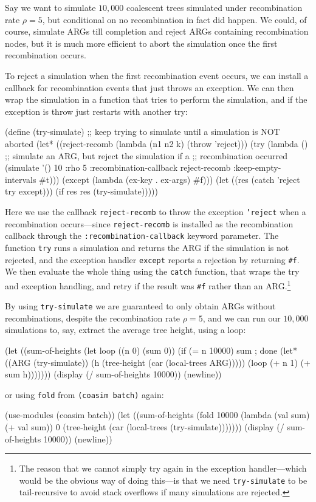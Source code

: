 \documentclass{manual}
\begin{document}
Say we want to simulate $10,000$ coalescent trees simulated under
recombination rate $\rho=5$, but conditional on no recombination in
fact did happen.  We could, of course, simulate ARGs till completion
and reject ARGs containing recombination nodes, but it is much more
efficient to abort the simulation once the first recombination occurs.

To reject a simulation when the first recombination event occurs, we
can install a callback for recombination events that just throws an
exception.  We can then wrap the simulation in a function that tries
to perform the simulation, and if the exception is throw just restarts
with another try:
\begin{code}
(define (try-simulate)
  ;; keep trying to simulate until a simulation is NOT aborted
  (let* ((reject-recomb (lambda (n1 n2 k) (throw 'reject)))
         (try (lambda ()
                ;; simulate an ARG, but reject the simulation if a
                ;; recombination occurred
                (simulate '() 10 :rho 5
                          :recombination-callback reject-recomb
                          :keep-empty-intervals   #t)))
         (except (lambda (ex-key . ex-args) #f)))
    (let ((res (catch 'reject try except)))
      (if res res (try-simulate)))))
\end{code}
Here we use the callback \texttt{reject-recomb} to throw the exception
\texttt{'reject} when a recombination occurs---since
\texttt{reject-recomb} is installed as the recombination callback
through the \texttt{:recombination-callback} keyword parameter.  The
function \texttt{try} runs a simulation and returns the ARG if the
simulation is not rejected, and the exception handler \texttt{except}
reports a rejection by returning \texttt{\#f}.  We then evaluate the
whole thing using the \texttt{catch} function, that wraps the try and
exception handling, and retry if the result was \texttt{\#f} rather
than an ARG.\footnote{The reason that we cannot simply try again in
  the exception handler---which would be the obvious way of doing
  this---is that we need \texttt{try-simulate} to be tail-recursive to
  avoid stack overflows if many simulations are rejected.}

By using \texttt{try-simulate} we are guaranteed to only obtain ARGs
without recombinations, despite the recombination rate $\rho=5$, and
we can run our $10,000$ simulations to, say, extract the average tree
height, using a loop:
\begin{code}
(let ((sum-of-heights
       (let loop ((n 0) (sum 0))
         (if (= n 10000) sum ; done
             (let* ((ARG (try-simulate))
                    (h   (tree-height (car (local-trees ARG)))))
               (loop (+ n 1) (+ sum h)))))))
  (display (/ sum-of-heights 10000))
  (newline))
\end{code}
or using \texttt{fold} from \texttt{(coasim batch)} again:
\begin{code}
(use-modules (coasim batch))
(let ((sum-of-heights
       (fold 10000 (lambda (val sum) (+ val sum)) 0
             (tree-height (car (local-trees (try-simulate)))))))
  (display (/ sum-of-heights 10000))
  (newline))
\end{code}
\end{document}

